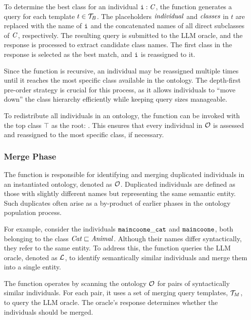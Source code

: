 %
To determine the best class for an individual \(\instance{i} : \concept{C}\), the function generates a query for each template \(t \in \relset{T}_{B}\).
%
The placeholders \(\mathit{individual}\) and \(\mathit{classes}\) in \(t\) are replaced with the name of \(\instance{i}\) and the concatenated names of all direct subclasses of \(\concept{C}\), respectively.
%
The resulting query is submitted to the \gls{LLM} oracle, and the response is processed to extract candidate class names.
%
The first class in the response is selected as the best match, and \(\instance{i}\) is reassigned to it.

%
Since the function is recursive, an individual may be reassigned multiple times until it reaches the most specific class available in the ontology.
%
The depth-first pre-order strategy is crucial for this process, as it allows individuals to ``move down'' the class hierarchy efficiently while keeping query sizes manageable.

%
To redistribute all individuals in an ontology, the function can be invoked with the top class \(\top\) as the root:
%
.
%
This ensures that every individual in \(\relset{O}\) is assessed and reassigned to the most specific class, if necessary.


\subsubsection{Merge Phase}
\label{subsubsec:merge-phase}
%

%
The \merge{} function is responsible for identifying and merging duplicated individuals in an instantiated ontology, denoted as $\relset{O}$.
%
Duplicated individuals are defined as those with slightly different names but representing the same semantic entity.
%
Such duplicates often arise as a by-product of earlier phases in the ontology population process.


For example, consider the individuals $\instance{maincoone\_cat}$ and $\instance{maincoone}$, both belonging to the class $\concept{Cat} \sqsubset \concept{Animal}$.
%
Although their names differ syntactically, they refer to the same entity.
%
To address this, the \merge{} function queries the \gls{LLM} oracle, denoted as $\relset{L}$, to identify semantically similar individuals and merge them into a single entity.


The \merge{} function operates by scanning the ontology $\relset{O}$ for pairs of syntactically similar individuals.
%
For each pair, it uses a set of merging query templates, $\relset{T}_{M}$, to query the \gls{LLM} oracle.
%
The oracle's response determines whether the individuals should be merged.



